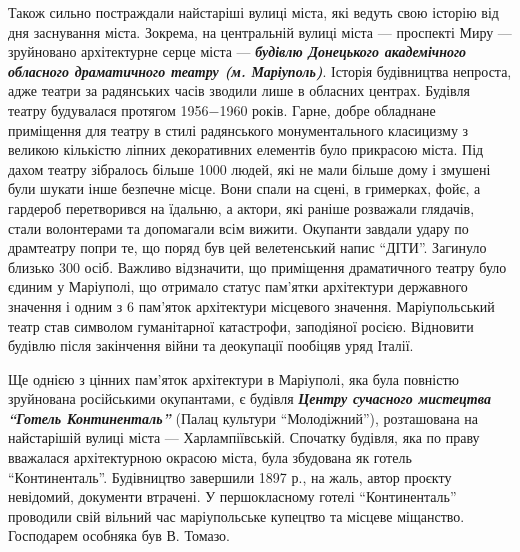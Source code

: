 
Також сильно постраждали найстаріші вулиці міста, які ведуть свою історію від
дня заснування міста. Зокрема, на центральній вулиці міста — проспекті Миру —
зруйновано архітектурне серце міста — \textbf{\emph{будівлю Донецького академічного обласного
драматичного театру (м. Маріуполь)}}. Історія будівництва непроста, адже театри
за радянських часів зводили лише в обласних центрах. Будівля театру будувалася
протягом 1956−1960 років. Гарне, добре обладнане приміщення для театру в стилі
радянського монументального класицизму з великою кількістю ліпних декоративних
елементів було прикрасою міста. Під дахом театру зібралось більше 1000 людей,
які не мали більше дому і змушені були шукати інше безпечне місце. Вони спали
на сцені, в гримерках, фойє, а гардероб перетворився на їдальню, а актори, які
раніше розважали глядачів, стали волонтерами та допомагали всім вижити.
Окупанти завдали удару по драмтеатру попри те, що поряд був цей велетенський
напис \enquote{ДІТИ}. Загинуло близько 300 осіб. Важливо відзначити, що приміщення
драматичного театру було єдиним у Маріуполі, що отримало статус пам'ятки
архітектури державного значення і одним з 6 пам'яток архітектури місцевого
значення. Маріупольський театр став символом гуманітарної катастрофи,
заподіяної росією. Відновити будівлю після закінчення війни та деокупації
пообіцяв уряд Італії.



Ще однією з цінних пам'яток архітектури в Маріуполі, яка була повністю
зруйнована російськими окупантами, є будівля \emph{\textbf{Центру сучасного мистецтва \enquote{Готель
Континенталь}}} (Палац культури \enquote{Молодіжний}), розташована на найстарішій вулиці
міста — Харлампіївській. Спочатку будівля, яка по праву вважалася архітектурною
окрасою міста, була збудована як готель \enquote{Континенталь}. Будівництво завершили
1897 р., на жаль, автор проєкту невідомий, документи втрачені. У першокласному
готелі \enquote{Континенталь} проводили свій вільний час маріупольське купецтво та
місцеве міщанство. Господарем особняка був В. Томазо.

